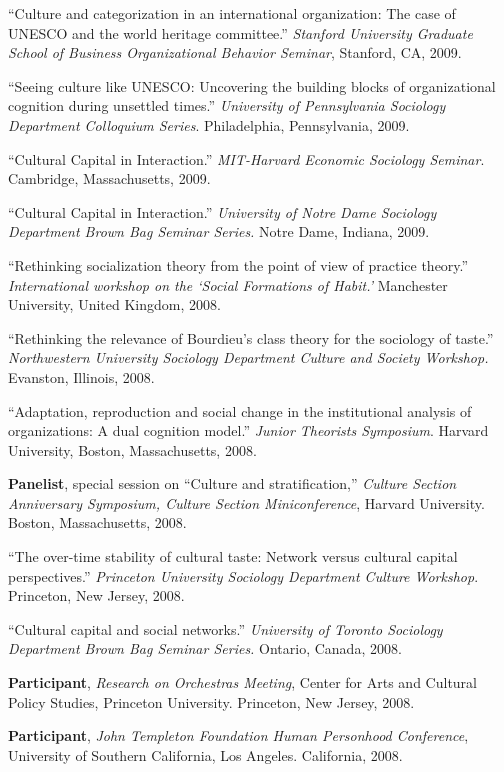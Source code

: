
\ind ``Culture and categorization in an international organization: The case of UNESCO and the world heritage committee.'' \emph{Stanford University Graduate School of Business Organizational Behavior Seminar}, Stanford, CA, 2009.

\ind ``Seeing culture like UNESCO: Uncovering the building blocks of organizational cognition during unsettled times.'' \emph{University of Pennsylvania Sociology Department Colloquium Series}. Philadelphia, Pennsylvania, 2009.

\ind ``Cultural Capital in Interaction.'' \emph{MIT-Harvard Economic Sociology Seminar}. Cambridge, Massachusetts, 2009.

\ind ``Cultural Capital in Interaction.''  \emph{University of Notre Dame Sociology Department Brown Bag Seminar Series.} Notre Dame, Indiana, 2009.

\ind  ``Rethinking socialization theory from the point of view of practice theory.''  \emph{International workshop on the `Social Formations of Habit.'} Manchester University, United Kingdom, 2008.

\ind  ``Rethinking the relevance of Bourdieu's class theory for the sociology of taste.'' \emph{Northwestern University Sociology Department Culture and Society Workshop.} Evanston, Illinois, 2008.

\ind  ``Adaptation, reproduction and social change in the institutional analysis of organizations:  A dual cognition model.''  \emph{Junior Theorists Symposium}.  Harvard University, Boston, Massachusetts, 2008.

\ind  \textbf{Panelist}, special session on ``Culture and stratification,'' \emph{Culture Section Anniversary Symposium, Culture Section Miniconference}, Harvard University. Boston, Massachusetts, 2008.

\ind  ``The over-time stability of cultural taste:  Network versus cultural capital perspectives.''   \emph{Princeton University Sociology Department Culture Workshop}.  Princeton, New Jersey, 2008.

\ind  ``Cultural capital and social networks.''  \emph{University of Toronto Sociology Department Brown Bag Seminar Series.} Ontario, Canada, 2008.

\ind  \textbf{Participant}, \emph{Research on Orchestras Meeting}, Center for Arts and Cultural Policy Studies, Princeton University. Princeton, New Jersey, 2008.

\ind \textbf{Participant}, \emph{ John Templeton Foundation Human Personhood Conference}, University of Southern California, Los Angeles. California, 2008.

